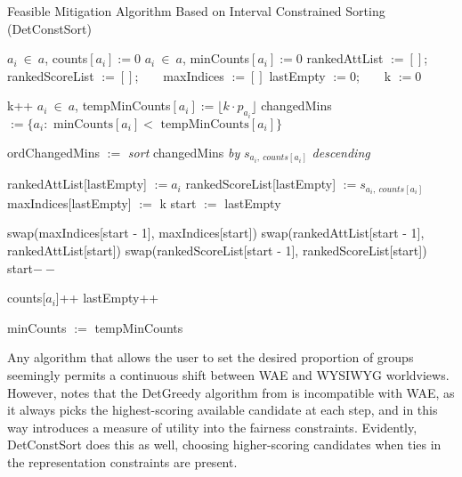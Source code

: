 \begin{algorithm}[h]
\caption{\small{Feasible Mitigation Algorithm Based on Interval Constrained Sorting (DetConstSort)}}
\label{alg:detconstsort}
\small
\begin{algorithmic}[1]

 $a_i ~ \in ~ a$, counts$[a_i] := 0$
 $a_i ~ \in ~ a$, minCounts$[a_i] := 0$
\STATE rankedAttList $:= [ ]$; ~ ~ rankedScoreList $:= [ ]$; ~ ~ maxIndices $:= [ ]$
\STATE lastEmpty $:= 0$; ~ ~ k $:= 0$

	\STATE k++
	 $a_i ~ \in ~ a$, tempMinCounts$[a_i] := \lfloor k \cdot p_{a_i} \rfloor$
	\STATE changedMins $:= \{ a_i: \textrm{ minCounts}[a_i] < \textrm{ tempMinCounts}[a_i] \}$

		\STATE ordChangedMins $:=$ {\em sort} changedMins {\em by} $s_{a_i, ~ counts[a_i]}$ {\em descending}
				
			\STATE rankedAttList[lastEmpty] $:= a_i$
			\STATE rankedScoreList[lastEmpty]  $:= s_{a_i, ~ counts[a_i]}$
			\STATE maxIndices[lastEmpty] $:=$ k
			\STATE start $:=$ lastEmpty

				\STATE swap(maxIndices[start - 1],  maxIndices[start])
				\STATE swap(rankedAttList[start - 1],  rankedAttList[start])
				\STATE swap(rankedScoreList[start - 1],  rankedScoreList[start])
				\STATE start$- -$
			\ENDWHILE
			
			\STATE counts[$a_i$]++
			\STATE lastEmpty++
		\ENDFOR

		\STATE minCounts $:=$ tempMinCounts
	\ENDIF
\ENDWHILE

\end{algorithmic}
\vspace{-1ex}
\end{algorithm}


Any algorithm that allows the user to set the desired proportion of groups seemingly permits a continuous shift between WAE and WYSIWYG worldviews. However, \cite{3533380} notes that the DetGreedy algorithm from \cite{linkedin} is incompatible with WAE, as it always picks the highest-scoring available candidate at each step, and in this way introduces a measure of utility into the fairness constraints. Evidently, DetConstSort does this as well, choosing higher-scoring candidates when ties in the representation constraints are present.

